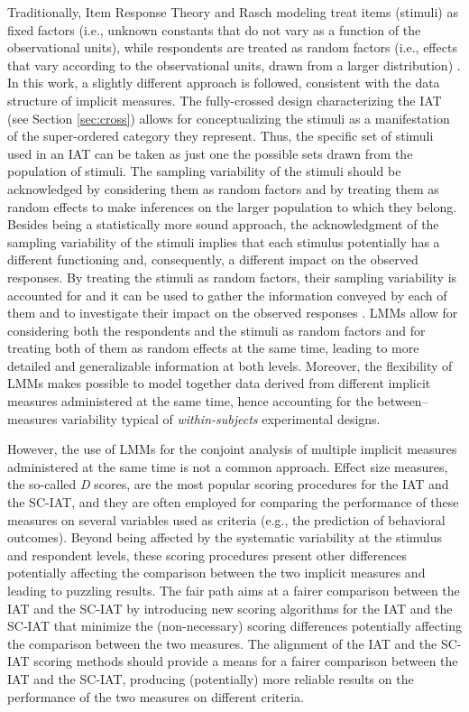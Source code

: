 \documentclass[12pt]{book}
\begin{document}
	Traditionally, Item Response Theory and Rasch modeling treat items (stimuli) as fixed factors (i.e., unknown constants that do not vary as a function of the observational units), while respondents are treated as random factors (i.e., effects that vary according to the observational units, drawn from a larger distribution) \cite{DeBoeck2011}.
	In this work, a slightly different approach is followed, consistent with the data structure of implicit measures. 
	The fully-crossed design characterizing the IAT (see Section \ref{sec:cross}) allows for conceptualizing the stimuli as a manifestation of the super-ordered category they represent. Thus, the specific set of stimuli used in an IAT can be taken as just one the possible sets drawn from the population of stimuli.  The sampling variability of the stimuli should be acknowledged by considering them as random factors and by treating them as random effects to make inferences on the larger population to which they belong. 
	Besides being a statistically more sound approach,
	the acknowledgment of the sampling variability of the stimuli implies that each stimulus potentially has a different functioning and, consequently, a different impact on the observed responses.
	By treating the stimuli as random factors, their sampling variability is accounted for and it can be used to gather the information conveyed by each of them and to investigate their impact on the observed responses \cite{wols2017}. 
    LMMs allow for considering both the respondents and the stimuli as random factors and for treating both of them as random effects at the same time, leading to more detailed and generalizable information at both levels. Moreover, the flexibility of LMMs makes possible to model together data derived from different implicit measures administered at the same time, hence accounting for the between--measures variability typical of \emph{within-subjects} experimental designs.

	However, the use of LMMs for the conjoint analysis of multiple implicit measures administered at the same time is not a common approach. 
	Effect size measures, the so-called \emph{D} scores, are the most popular scoring procedures for the IAT and the SC-IAT, and they are often employed for comparing the  performance of these measures on several variables used as criteria (e.g., the prediction of behavioral outcomes). 
	Beyond being affected by the systematic variability at the stimulus and respondent levels, these scoring procedures present other differences potentially affecting the comparison between the two implicit measures and leading to puzzling results. 
The fair path aims at a fairer comparison between the IAT and the SC-IAT by introducing new scoring algorithms for the IAT and the SC-IAT that minimize the (non-necessary) scoring differences potentially affecting the comparison between the two measures.
The alignment of the IAT and the SC-IAT scoring methods should provide a means for a fairer comparison between the IAT and  the SC-IAT, producing (potentially) more reliable results on the performance of the two measures on different criteria. 
	
\end{document}
